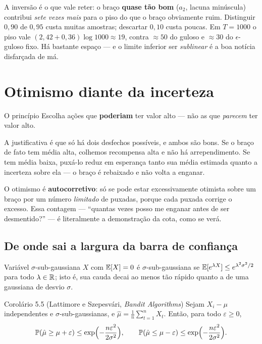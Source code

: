 \documentclass[11pt, a4paper]{article}
\newcommand{\muhat}{\hat{\mu}}
\begin{document}
\begin{ideiabox}
A inversão é o que vale reter: o braço \textbf{quase tão bom} ($a_2$, lacuna
minúscula) contribui \emph{sete vezes mais} para o piso do que o braço
obviamente ruim. Distinguir $0{,}90$ de $0{,}95$ custa muitas amostras;
descartar $0{,}10$ custa poucas. Em $T = 1000$ o piso vale
$(2{,}42 + 0{,}36)\log 1000 \approx 19$, contra $\approx 50$ do guloso e
$\approx 30$ do $\epsilon$-guloso fixo. Há bastante espaço — e o limite
inferior ser \emph{sublinear} é a boa notícia disfarçada de má.
\end{ideiabox}

\section{Otimismo diante da incerteza}

\begin{defbox}{O princípio}
Escolha ações que \textbf{poderiam} ter valor alto — não as que
\emph{parecem} ter valor alto.
\end{defbox}

A justificativa é que só há dois desfechos possíveis, e ambos são bons. Se o
braço de fato tem média alta, colhemos recompensa alta e não há
arrependimento. Se tem média baixa, puxá-lo reduz em esperança tanto sua
média estimada quanto a incerteza sobre ela — o braço é rebaixado e não volta
a enganar.

\begin{ideiabox}
O otimismo é \textbf{autocorretivo}: só se pode estar excessivamente otimista
sobre um braço por um número \emph{limitado} de puxadas, porque cada puxada
corrige o excesso. Essa contagem — ``quantas vezes posso me enganar antes de
ser desmentido?'' — é literalmente a demonstração da cota, como se verá.
\end{ideiabox}

\subsection*{De onde sai a largura da barra de confiança}

\begin{defbox}{Variável $\sigma$-sub-gaussiana}
$X$ com $\mathbb{E}[X] = 0$ é $\sigma$-sub-gaussiana se
$\mathbb{E}[e^{\lambda X}] \le e^{\lambda^2\sigma^2/2}$ para todo $\lambda \in \mathbb{R}$;
isto é, sua cauda decai ao menos tão rápido quanto a de uma gaussiana de
desvio $\sigma$.
\end{defbox}

\begin{teobox}{Corolário 5.5 (Lattimore e Szepesvári, \emph{Bandit Algorithms})}
Sejam $X_i - \mu$ independentes e $\sigma$-sub-gaussianas, e
$\muhat = \frac1n\sum_{t=1}^{n} X_t$. Então, para todo $\varepsilon \ge 0$,
\[
  \Prob(\muhat \ge \mu + \varepsilon) \le \exp\Bigl(-\frac{n\varepsilon^2}{2\sigma^2}\Bigr),
  \qquad
  \Prob(\muhat \le \mu - \varepsilon) \le \exp\Bigl(-\frac{n\varepsilon^2}{2\sigma^2}\Bigr).
\]
\end{teobox}
\end{document}
